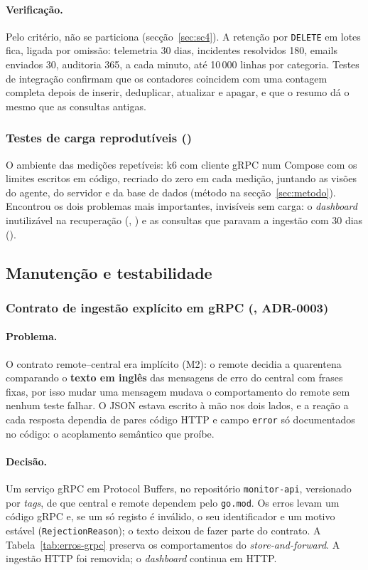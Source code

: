 \paragraph{Verificação.}
Pelo critério, não se particiona (secção~\ref{sec:sc4}). A retenção por \texttt{DELETE} em lotes fica, ligada por
omissão: telemetria 30 dias, incidentes resolvidos 180, emails enviados 30, auditoria 365, a cada minuto, até
10\,000 linhas por categoria. Testes de integração confirmam que os contadores coincidem com uma contagem completa
depois de inserir, deduplicar, atualizar e apagar, e que o resumo dá o mesmo que as consultas antigas.

\subsubsection{Testes de carga reprodutíveis ()}
\label{sec:d10}
O ambiente das medições repetíveis: k6 com cliente gRPC num Compose com os limites escritos em código, recriado do
zero em cada medição, juntando as visões do agente, do servidor e da base de dados (método na
secção~\ref{sec:metodo}). Encontrou os dois problemas mais importantes, invisíveis sem carga: o \emph{dashboard}
inutilizável na recuperação (, ) e as consultas que paravam a ingestão com 30 dias ().

\subsection{Manutenção e testabilidade}

\subsubsection{Contrato de ingestão explícito em gRPC (, ADR-0003)}
\label{sec:d11}

\paragraph{Problema.}
O contrato remote--central era implícito (M2): o remote decidia a quarentena comparando o \textbf{texto em inglês}
das mensagens de erro do central com frases fixas, por isso mudar uma mensagem mudava o comportamento do remote sem
nenhum teste falhar. O JSON estava escrito à mão nos dois lados, e a reação a cada resposta dependia de pares código
HTTP e campo \texttt{error} só documentados no código: o acoplamento semântico que  proíbe.

\paragraph{Decisão.}
Um serviço gRPC em Protocol Buffers, no repositório \texttt{monitor-api}, versionado por \emph{tags}, de que
central e remote dependem pelo \texttt{go.mod}. Os erros levam um código gRPC e, se um só registo é inválido, o seu
identificador e um motivo estável (\texttt{RejectionReason}); o texto deixou de fazer parte do contrato. A
Tabela~\ref{tab:erros-grpc} preserva os comportamentos do \emph{store-and-forward}. A ingestão HTTP foi removida;
o \emph{dashboard} continua em HTTP.

